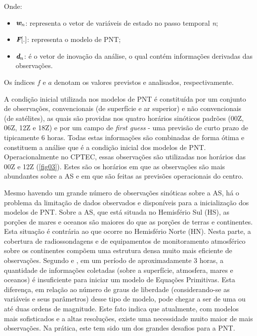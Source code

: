Onde:

\begin{itemize}
\item $\textit{\textbf{w}}_{n}$: representa o vetor de variáveis de estado no passo temporal \textit{n};
\item $\textit{\textbf{F}}[.]$: representa o modelo de PNT;
\item $\textit{\textbf{d}}_{n}$: é o vetor de inovação da análise, o qual contém informações derivadas das observações.
\end{itemize}

Os índices $\textit{f}$ e $\textit{a}$ denotam os valores previstos e analisados, respectivamente.

A condição inicial utilizada nos modelos de PNT é constituída por um conjunto de observações, convencionais (de superfície e ar superior) e não convencionais (de satélites), as quais são providas nos quatro horários sinóticos padrões (00Z, 06Z, 12Z e 18Z) e por um campo de \textit{first guess} - uma previsão de curto prazo de tipicamente 6 horas. Todas estas informações são combinadas de forma ótima e constituem a análise que é a condição inicial dos modelos de PNT. Operacionalmente no CPTEC, essas observações são utilizadas nos horários das 00Z e 12Z (\autoref{fig03}). Estes são os horários em que as observações são mais abundantes sobre a AS e em que são feitas as previsões operacionais do centro. 

Mesmo havendo um grande número de observações sinóticas sobre a AS, há o problema da limitação de dados observados e disponíveis para a inicialização dos modelos de PNT. Sobre a AS, que está situada no Hemisfério Sul (HS), as porções de mares e oceanos são maiores do que as porções de terras e continentes. Esta situação é contrária ao que ocorre no Hemisfério Norte (HN). Nesta parte, a cobertura de radiossondagens e de equipamentos de monitoramento atmosférico sobre os continentes compõem uma estrutura densa muito mais eficiente de observações. Segundo  e , em um período de aproximadamente 3 horas, a quantidade de informações coletadas (sobre a superfície, atmosfera, mares e oceanos) é insuficiente para iniciar um modelo de Equações Primitivas. Esta diferença, em relação ao número de graus de liberdade (considerando-se as variáveis e seus parâmetros) desse tipo de modelo, pode chegar a ser de uma ou até duas ordens de magnitude. Este fato indica que atualmente, com modelos mais sofisticados e a altas resoluções, existe uma necessidade muito maior de mais observações. Na prática, este tem sido um dos grandes desafios para a PNT. 

